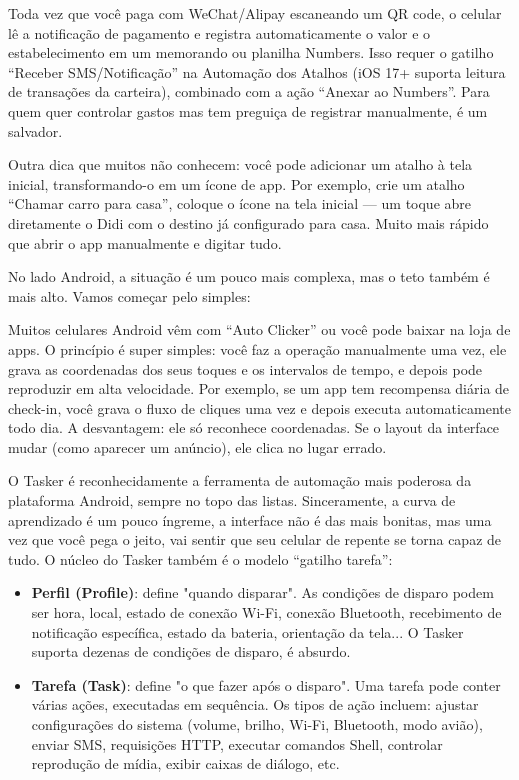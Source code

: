 
Toda vez que você paga com WeChat/Alipay escaneando um QR code, o celular lê a notificação de pagamento e registra automaticamente o valor e o estabelecimento em um memorando ou planilha Numbers. Isso requer o gatilho “Receber SMS/Notificação” na Automação dos Atalhos (iOS 17+ suporta leitura de transações da carteira), combinado com a ação “Anexar ao Numbers”. Para quem quer controlar gastos mas tem preguiça de registrar manualmente, é um salvador.

Outra dica que muitos não conhecem: você pode adicionar um atalho à tela inicial, transformando-o em um ícone de app. Por exemplo, crie um atalho “Chamar carro para casa”, coloque o ícone na tela inicial — um toque abre diretamente o Didi com o destino já configurado para casa. Muito mais rápido que abrir o app manualmente e digitar tudo.


No lado Android, a situação é um pouco mais complexa, mas o teto também é mais alto. Vamos começar pelo simples:


Muitos celulares Android vêm com “Auto Clicker” ou você pode baixar na loja de apps. O princípio é super simples: você faz a operação manualmente uma vez, ele grava as coordenadas dos seus toques e os intervalos de tempo, e depois pode reproduzir em alta velocidade. Por exemplo, se um app tem recompensa diária de check-in, você grava o fluxo de cliques uma vez e depois executa automaticamente todo dia. A desvantagem: ele só reconhece coordenadas. Se o layout da interface mudar (como aparecer um anúncio), ele clica no lugar errado.


O Tasker é reconhecidamente a ferramenta de automação mais poderosa da plataforma Android, sempre no topo das listas. Sinceramente, a curva de aprendizado é um pouco íngreme, a interface não é das mais bonitas, mas uma vez que você pega o jeito, vai sentir que seu celular de repente se torna capaz de tudo. O núcleo do Tasker também é o modelo “gatilho tarefa”:

\begin{itemize}
  \item \textbf{Perfil (Profile)}: define "quando disparar". As condições de disparo podem ser hora, local, estado de conexão Wi-Fi, conexão Bluetooth, recebimento de notificação específica, estado da bateria, orientação da tela... O Tasker suporta dezenas de condições de disparo, é absurdo.
  \item \textbf{Tarefa (Task)}: define "o que fazer após o disparo". Uma tarefa pode conter várias ações, executadas em sequência. Os tipos de ação incluem: ajustar configurações do sistema (volume, brilho, Wi-Fi, Bluetooth, modo avião), enviar SMS, requisições HTTP, executar comandos Shell, controlar reprodução de mídia, exibir caixas de diálogo, etc.
\end{itemize}

